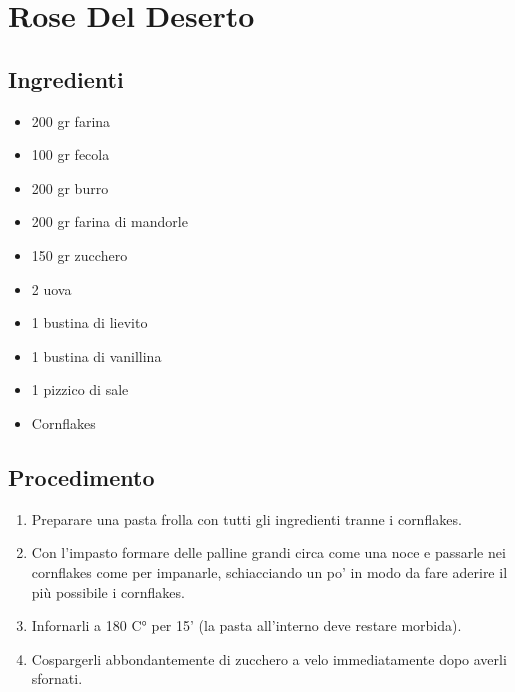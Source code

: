 \section{Rose Del Deserto}
\subsection{Ingredienti}
\begin{itemize}
\item 200 gr farina  
\item 100 gr fecola  
\item 200 gr burro  
\item 200 gr farina di mandorle  
\item 150 gr zucchero  
\item 2 uova  
\item 1 bustina di lievito  
\item 1 bustina di vanillina  
\item 1 pizzico di sale  
\item Cornflakes
\end{itemize}
\subsection{Procedimento}
\begin{enumerate}
\item  Preparare una pasta frolla con tutti gli ingredienti tranne i cornflakes.  
\item  Con l'impasto formare delle palline grandi circa come una noce e passarle nei cornflakes come per impanarle, schiacciando un po' in modo da fare aderire il più possibile i cornflakes.  
\item  Infornarli a 180 C° per 15' (la pasta all'interno deve restare morbida).  
\item  Cospargerli abbondantemente di zucchero a velo immediatamente dopo averli sfornati.
\end{enumerate}
